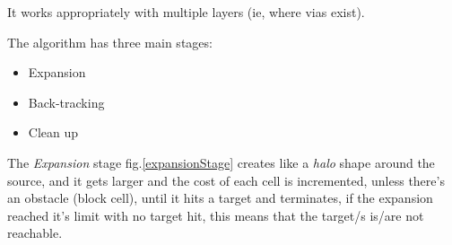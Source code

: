     It works appropriately with multiple layers (ie, where vias exist).

    The algorithm has three main stages:
    \begin{itemize}
        \item Expansion
        \item Back-tracking
        \item Clean up
    \end{itemize}

    The \textit{Expansion} stage fig.\ref{expansionStage} creates like a \textit{halo} shape around the source,
    and it gets larger and the cost of each cell is incremented,
    unless there's an obstacle (block cell),
    until it hits a target and terminates,
    if the expansion reached it's limit with no target hit, this means that the target/s is/are not
    reachable.
